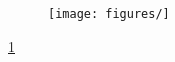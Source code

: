 \begin{figure}[htbp]
   \centering
   \texttt{[image: figures/]}
   \caption{}
   \label{fig:}
\end{figure}

\ref{fig:}
